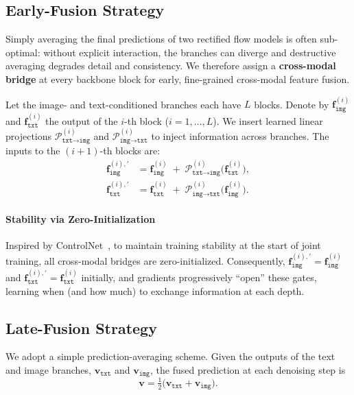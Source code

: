 \subsection{Early-Fusion Strategy}
Simply averaging the final predictions of two rectified flow models is often sub-optimal: without explicit interaction, the branches can diverge and destructive averaging degrades detail and consistency. We therefore assign a \textbf{cross-modal bridge} at every backbone block for early, fine-grained cross-modal feature fusion.

Let the image- and text-conditioned branches each have \(L\) blocks. Denote by \(\mathbf{f}^{(i)}_{\texttt{img}}\) and \(\mathbf{f}^{(i)}_{\texttt{txt}}\) the output of the \(i\)-th block (\(i{=}1,\dots,L\)). We insert learned linear projections $\mathcal{P}^{(i)}_{\texttt{txt}\rightarrow\texttt{img}}$ and $\mathcal{P}^{(i)}_{\texttt{img}\rightarrow\texttt{txt}}$ to inject information across branches. The inputs to the \((i{+}1)\)-th blocks are:
\begin{equation}
\label{eq:feature-switch}
\begin{aligned}
\mathbf{f}^{(i),\prime}_{\texttt{img}} &= \mathbf{f}^{(i)}_{\texttt{img}} \;+\; \mathcal{P}^{(i)}_{\texttt{txt}\rightarrow\texttt{img}}\!\big(\mathbf{f}^{(i)}_{\texttt{txt}}\big),\\
\mathbf{f}^{(i),\prime}_{\texttt{txt}} &= \mathbf{f}^{(i)}_{\texttt{txt}} \;+\; \mathcal{P}^{(i)}_{\texttt{img}\rightarrow\texttt{txt}}\!\big(\mathbf{f}^{(i)}_{\texttt{img}}\big).
\end{aligned}
\end{equation}

\paragraph{Stability via Zero-Initialization}
Inspired by ControlNet~\cite{controlnet}, to maintain training stability at the start of joint training, all cross-modal bridges are zero-initialized. Consequently, \(\mathbf{f}^{(i),\prime}_{\texttt{img}}=\mathbf{f}^{(i)}_{\texttt{img}}\) and \(\mathbf{f}^{(i),\prime}_{\texttt{txt}}=\mathbf{f}^{(i)}_{\texttt{txt}}\) initially, and gradients progressively ``open'' these gates, learning when (and how much) to exchange information at each depth.

\subsection{Late-Fusion Strategy}
\label{sec:late_fusion}
We adopt a simple prediction-averaging scheme. Given the outputs of the text and image branches, $\mathbf{v}_{\texttt{txt}}$ and $\mathbf{v}_{\texttt{img}}$, the fused prediction at each denoising step is
\begin{equation}
    \mathbf{v} = \tfrac{1}{2}\big(\mathbf{v}_{\texttt{txt}} + \mathbf{v}_{\texttt{img}}\big).
\end{equation}

